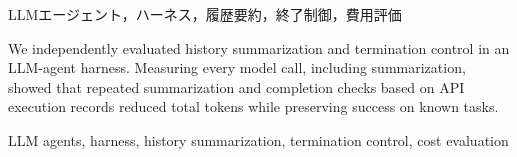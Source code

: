 \begin{abstract}
LLMエージェントの履歴要約と終了制御を独立に評価した．要約生成を含む全モデル呼出しを計測し，反復要約とAPI実行記録に基づく完了判定により，既知課題の成功を保ちながら総トークン数を削減できることを示した．
\end{abstract}
\begin{keyword}
LLMエージェント，ハーネス，履歴要約，終了制御，費用評価
\end{keyword}
\begin{eabstract}
We independently evaluated history summarization and termination control in an LLM-agent harness. Measuring every model call, including summarization, showed that repeated summarization and completion checks based on API execution records reduced total tokens while preserving success on known tasks.
\end{eabstract}
\begin{ekeyword}
LLM agents, harness, history summarization, termination control, cost evaluation
\end{ekeyword}
